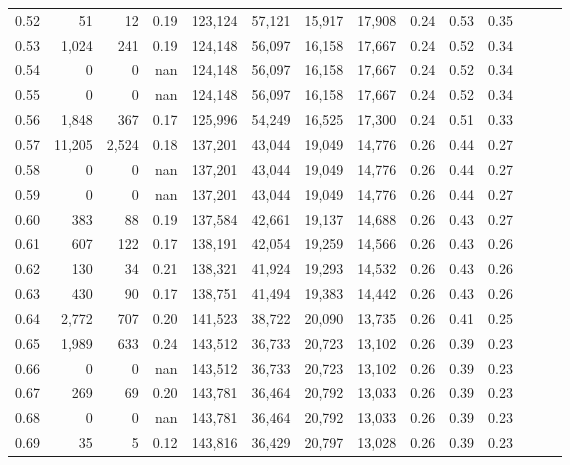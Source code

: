 \begin{tabular}{rrrrrrrrrrrrrr}
0.52 &      51 &     12 &  0.19 &  123,124 &   57,121 &  15,917 &  17,908 &  0.24 &  0.53 &      0.35 \\
0.53 &   1,024 &    241 &  0.19 &  124,148 &   56,097 &  16,158 &  17,667 &  0.24 &  0.52 &      0.34 \\
0.54 &       0 &      0 &   nan &  124,148 &   56,097 &  16,158 &  17,667 &  0.24 &  0.52 &      0.34 \\
0.55 &       0 &      0 &   nan &  124,148 &   56,097 &  16,158 &  17,667 &  0.24 &  0.52 &      0.34 \\
0.56 &   1,848 &    367 &  0.17 &  125,996 &   54,249 &  16,525 &  17,300 &  0.24 &  0.51 &      0.33 \\
0.57 &  11,205 &  2,524 &  0.18 &  137,201 &   43,044 &  19,049 &  14,776 &  0.26 &  0.44 &      0.27 \\
0.58 &       0 &      0 &   nan &  137,201 &   43,044 &  19,049 &  14,776 &  0.26 &  0.44 &      0.27 \\
0.59 &       0 &      0 &   nan &  137,201 &   43,044 &  19,049 &  14,776 &  0.26 &  0.44 &      0.27 \\
0.60 &     383 &     88 &  0.19 &  137,584 &   42,661 &  19,137 &  14,688 &  0.26 &  0.43 &      0.27 \\
0.61 &     607 &    122 &  0.17 &  138,191 &   42,054 &  19,259 &  14,566 &  0.26 &  0.43 &      0.26 \\
0.62 &     130 &     34 &  0.21 &  138,321 &   41,924 &  19,293 &  14,532 &  0.26 &  0.43 &      0.26 \\
0.63 &     430 &     90 &  0.17 &  138,751 &   41,494 &  19,383 &  14,442 &  0.26 &  0.43 &      0.26 \\
0.64 &   2,772 &    707 &  0.20 &  141,523 &   38,722 &  20,090 &  13,735 &  0.26 &  0.41 &      0.25 \\
0.65 &   1,989 &    633 &  0.24 &  143,512 &   36,733 &  20,723 &  13,102 &  0.26 &  0.39 &      0.23 \\
0.66 &       0 &      0 &   nan &  143,512 &   36,733 &  20,723 &  13,102 &  0.26 &  0.39 &      0.23 \\
0.67 &     269 &     69 &  0.20 &  143,781 &   36,464 &  20,792 &  13,033 &  0.26 &  0.39 &      0.23 \\
0.68 &       0 &      0 &   nan &  143,781 &   36,464 &  20,792 &  13,033 &  0.26 &  0.39 &      0.23 \\
0.69 &      35 &      5 &  0.12 &  143,816 &   36,429 &  20,797 &  13,028 &  0.26 &  0.39 &      0.23 \\

\end{tabular}
